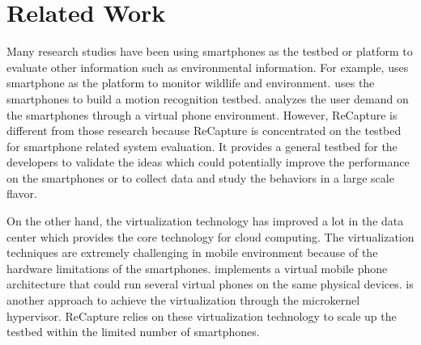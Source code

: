 \section{Related Work}\label{sec:relatedwork}
Many research studies have been using smartphones as the testbed or platform to evaluate other information such as environmental information. For example, \cite{lukac2011soundproof} uses smartphone as the platform to monitor wildlife and environment. \cite{jo2013towards} uses the smartphones to build a motion recognition testbed. \cite{heo2010user} analyzes the user demand on the smartphones through a virtual phone environment. However, ReCapture is different from those research because ReCapture is concentrated on the testbed for smartphone related system evaluation. It provides a general testbed for the developers to validate the ideas which could potentially improve the performance on the smartphones or to collect data and study the behaviors in a large scale flavor.

On the other hand, the virtualization technology has improved a lot in the data center which provides the core technology for cloud computing. The virtualization techniques are extremely challenging in mobile environment because of the hardware limitations of the smartphones. \cite{andrus2011cells} implements a virtual mobile phone architecture that could run several virtual phones on the same physical devices. \cite{acharya2009phone} is another approach to achieve the virtualization through the microkernel hypervisor. ReCapture relies on these virtualization technology to scale up the testbed within the limited number of smartphones.
